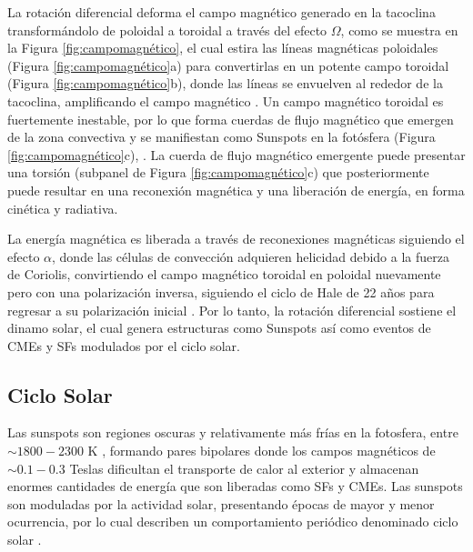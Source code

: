 La rotación diferencial deforma el campo magnético generado en la tacoclina \parencite[e.g.,][]{glatzmaier-1985} transformándolo de poloidal a toroidal a través del efecto $\Omega$, como se muestra en la Figura \ref{fig:campomagnético}, el cual estira las líneas magnéticas poloidales (Figura \ref{fig:campomagnético}a) para convertirlas en un potente campo toroidal (Figura \ref{fig:campomagnético}b), donde las líneas se envuelven al rededor de la tacoclina, amplificando el campo magnético \parencite[e.g.,][]{hughes-2007}. Un campo magnético toroidal es fuertemente inestable, por lo que forma cuerdas de flujo magnético que emergen de la zona convectiva y se manifiestan como \ac{Sunspots} en la fotósfera (Figura \ref{fig:campomagnético}c), \parencite[e.g.,][]{babcock-1961, parker-1955, low-1996, browning-1986, kilpua-2017}. La cuerda de flujo magnético emergente puede presentar una torsión (subpanel de Figura \ref{fig:campomagnético}c) que posteriormente puede resultar en una reconexión magnética y una liberación de energía, en forma cinética y radiativa.

La energía magnética es liberada a través de reconexiones magnéticas siguiendo el efecto $\alpha$, donde las células de convección adquieren helicidad debido a la fuerza de Coriolis, convirtiendo el campo magnético toroidal en poloidal nuevamente pero con una polarización inversa, siguiendo el ciclo de Hale de 22 años para regresar a su polarización inicial \parencite[e.g.,][]{lugaz-2005, ossendrijver-2003, hale-1919, babcock-1952, unknown-author-1958, mcintosh-2014}. Por lo tanto, la rotación diferencial sostiene el dinamo solar, el cual genera estructuras como \ac{Sunspots} así como eventos de \acp{CME} y \acp{SF} modulados por el ciclo solar.

\subsection*{Ciclo Solar}

Las sunspots son regiones oscuras y relativamente más frías en la fotosfera, entre $\sim1800-2300$ K \parencite[e,g.,][]{solanki-2003}, formando pares bipolares donde los campos magnéticos de $\sim0.1-0.3$ Teslas \parencite[e.g.,][]{ossendrijver-2003} dificultan el transporte de calor al exterior y almacenan enormes cantidades de energía que son liberadas como \acp{SF} y \acp{CME}. Las sunspots son moduladas por la actividad solar, presentando épocas de mayor y menor ocurrencia, por lo cual describen un comportamiento periódico denominado ciclo solar \parencite[e.g.,][]{hathaway-2015, webb-1994}.

